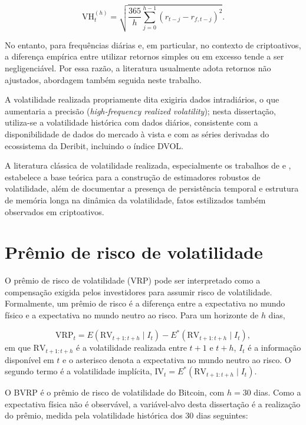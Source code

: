 \[
\text{VH}_t^{(h)} = \sqrt{ \frac{365}{h} \sum_{j=0}^{h-1} \left( r_{t-j} - r_{f,t-j} \right)^2 }.
\]

No entanto, para frequências diárias e, em particular, no contexto de criptoativos,
a diferença empírica entre utilizar retornos simples ou em excesso tende a ser
negligenciável. Por essa razão, a literatura usualmente adota retornos não ajustados,
abordagem também seguida neste trabalho.

A volatilidade realizada propriamente dita exigiria dados intradiários, o que
aumentaria a precisão (\textit{high-frequency realized volatility}); nesta
dissertação, utiliza-se a volatilidade histórica com dados diários, consistente
com a disponibilidade de dados do mercado à vista e com as séries derivadas do
ecossistema da Deribit, incluindo o índice DVOL.

A literatura clássica de volatilidade realizada, especialmente os trabalhos de
\citet{andersen2003realized} e \citet{corsi2009har}, estabelece a base teórica
para a construção de estimadores robustos de volatilidade, além de documentar a
presença de persistência temporal e estrutura de memória longa na dinâmica da
volatilidade, fatos estilizados também observados em criptoativos.
\section{Prêmio de risco de volatilidade}
\label{sec:vrp-teorico}

O prêmio de risco de volatilidade (VRP) pode ser interpretado como a
compensação exigida pelos investidores para assumir risco de volatilidade.
Formalmente, um prêmio de risco é a diferença entre a expectativa no mundo
físico e a expectativa no mundo neutro ao risco. Para um horizonte de $h$ dias,

\begin{equation}
\text{VRP}_t = E(\text{RV}_{t+1:t+h} \mid I_t) - E^*(\text{RV}_{t+1:t+h} \mid I_t),
\label{eq:vrp-def}
\end{equation}
em que $\text{RV}_{t+1:t+h}$ é a volatilidade realizada entre $t+1$ e $t+h$,
$I_t$ é a informação disponível em $t$ e o asterisco denota a expectativa no
mundo neutro ao risco. O segundo termo é a volatilidade implícita,
$\text{IV}_t = E^*(\text{RV}_{t+1:t+h} \mid I_t)$.

O BVRP é o prêmio de risco de volatilidade do Bitcoin, com $h = 30$ dias. Como
a expectativa física não é observável, a variável-alvo desta dissertação é a
realização do prêmio, medida pela volatilidade histórica dos 30 dias seguintes:

